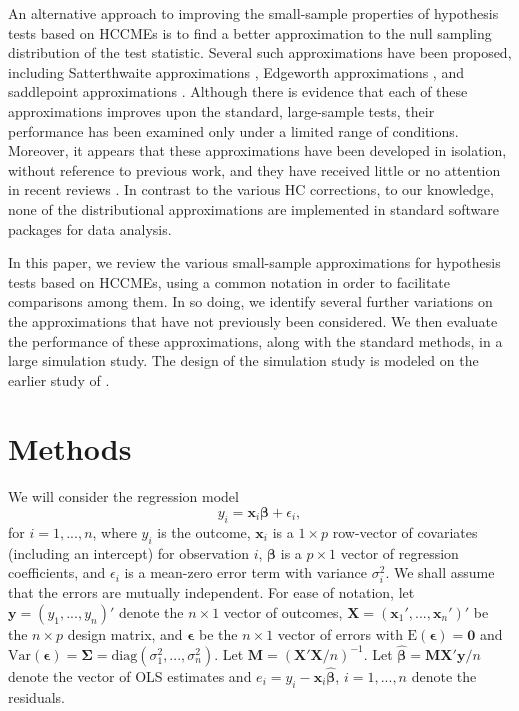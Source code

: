\documentclass[12pt]{article}\usepackage[]{graphicx}\usepackage[]{color}
\newcommand{\E}{\text{E}}
\newcommand{\Var}{\text{Var}}
\newcommand{\diag}{\text{diag}}
\newcommand{\bm}{\mathbf}
\newcommand{\bs}{\boldsymbol}
\begin{document}
An alternative approach to improving the small-sample properties of hypothesis tests based on HCCMEs is to find a better approximation to the null sampling distribution of the test statistic. 
Several such approximations have been proposed, including Satterthwaite approximations \citep{Lipsitz1999degrees}, Edgeworth approximations \citep{Rothenberg1988approximate, Kauermann2001note}, and saddlepoint approximations \citep{McCaffrey2006improved}. 
Although there is evidence that each of these approximations improves upon the standard, large-sample tests, their performance has been examined only under a limited range of conditions. 
Moreover, it appears that these approximations have been developed in isolation, without reference to previous work, and they have received little or no attention in recent reviews \citep[e.g., none are discussed by][]{MacKinnon2013thirty}. 
In contrast to the various HC corrections, to our knowledge, none of the distributional approximations are implemented in standard software packages for data analysis. 

In this paper, we review the various small-sample approximations for hypothesis tests based on HCCMEs, using a common notation in order to facilitate comparisons among them. In so doing, we identify several further variations on the approximations that have not previously been considered. We then evaluate the performance of these approximations, along with the standard methods, in a large simulation study. The design of the simulation study is modeled on the earlier study of \citet{Long2000using}.

\section{Methods}
\label{sec:model}

We will consider the regression model
\begin{equation}
y_i = \bm{x}_i\bs\beta + \epsilon_i,
\end{equation}
for $i = 1,...,n$, where $y_i$ is the outcome, $\bm{x}_i$ is a $1 \times p$ row-vector of covariates (including an intercept) for observation $i$, $\bs\beta$ is a $p \times 1$ vector of regression coefficients, and $\epsilon_i$ is a mean-zero error term with variance $\sigma_i^2$. 
We shall assume that the errors are mutually independent. 
For ease of notation, let $\bm{y} = \left(y_1,...,y_n\right)'$ denote the $n \times 1$ vector of outcomes, $\bm{X} = \left(\bm{x}_1',...,\bm{x}_n'\right)'$ be the $n \times p$ design matrix, and $\bs\epsilon$ be the $n \times 1$ vector of errors with $\E\left(\bs\epsilon\right) = \bm{0}$ and $\Var\left(\bs\epsilon\right) = \bs\Sigma = \diag\left(\sigma_1^2,...,\sigma_n^2\right)$. 
Let $\bm{M} = \left(\bm{X}'\bm{X} / n\right)^{-1}$. 
Let $\bs{\hat\beta} = \bm{M}\bm{X}'\bm{y} / n$ denote the vector of OLS estimates and $e_i = y_i - \bm{x}_i \bs{\hat\beta}$, $i = 1,...,n$ denote the residuals. 
\end{document}
